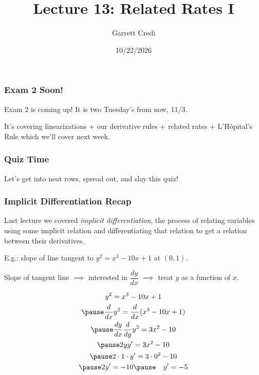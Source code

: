 \documentclass{ltx-talk}
\title{Lecture 13: Related Rates I}
\author{Garrett Credi}
\date{10/22/2026}
\begin{document}
\begin{frame}
  \maketitle
\end{frame}

\begin{frame}
  \frametitle{Exam 2 Soon!}

  Exam 2 is coming up! It is two Tuesday's from now, 11/3.

  It's covering linearizations + our derivative rules + related rates + L'Hôpital's Rule
  which we'll cover next week.
\end{frame}

\begin{frame}
  \frametitle{Quiz Time}

  Let's get into neat rows, spread out, and slay this quiz!
\end{frame}

\begin{frame}
  \frametitle{Implicit Differentiation Recap}

  Last lecture we covered \textit{implicit differentiation},
  the process of relating variables using some implicit relation \pause
  and differentiating that relation to get a relation between their derivatives. \pause

  E.g.: slope of line tangent to $y^2 = x^3 - 10x + 1$ at $(0,1)$. \pause

  Slope of tangent line $\implies$ interested in $\dfrac{dy}{dx}$ $\implies$ treat $y$ as a function of $x$. \pause

  \begin{gather}
    y^2 = x^3 - 10x + 1 \\ \pause
    \dfrac{d}{dx} y^2 = \dfrac{d}{dx} (x^3 - 10x + 1) \\ \pause
    \dfrac{dy}{dx} \dfrac{d}{dy} y^2 = 3x^2 - 10 \\ \pause
    2y y' = 3x^2 - 10 \\ \pause
    2 \cdot 1 \cdot y' = 3 \cdot 0^2 - 10 \\ \pause
    2 y' = -10 \pause \quad y' = -5 
  \end{gather}
\end{frame}
\end{document}
